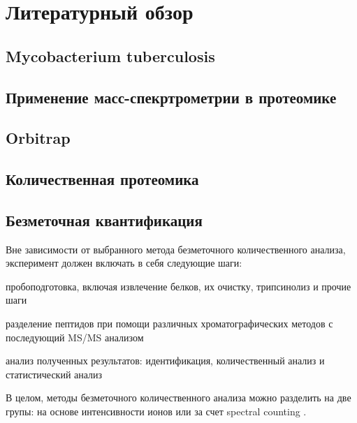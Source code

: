 \section{Литературный обзор}

\subsection{Mycobacterium tuberculosis}

\subsection{Применение масс-спекртрометрии в протеомике}

\subsection{Orbitrap}

\subsection{Количественная протеомика}




\subsection{Безметочная квантификация}
Вне зависимости от выбранного метода безметочного количественного анализа, эксперимент должен включать в себя следующие шаги:
\begin{inparaenum}
    \item  пробоподготовка, включая извлечение белков, их очистку, трипсинолиз и прочие шаги 
    \item разделение пептидов при помощи различных хроматографических методов с 
    последующий MS/MS анализом 
    \item анализ полученных результатов: идентификация, количественный анализ и статистический анализ
\end{inparaenum}
В целом, методы безметочного количественного анализа можно разделить на две групы: на основе интенсивности ионов или за счет spectral counting \cite{zhu2009mass}.

